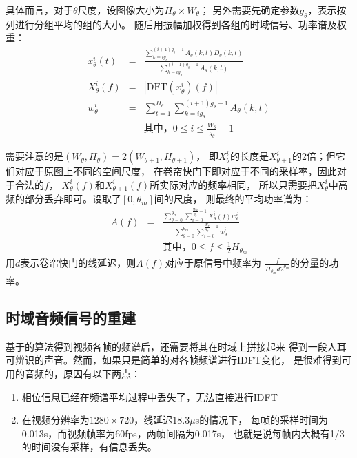 具体而言，对于$\theta$尺度，设图像大小为$H_\theta \times W_\theta$；
另外需要先确定参数$g_\theta$，表示按列进行分组平均的组的大小。
随后用振幅加权得到各组的时域信号、功率谱及权重：
\begin{eqnarray}
    x_\theta^i(t) &=& \frac{\sum_{k=ig_\theta}^{(i+1)g_\theta-1}
    A_\theta(k, t)D_\theta(k, t)}
        {\sum_{k=ig_\theta}^{(i+1)g_\theta-1}A_\theta(k, t)} \\
    X_\theta^i(f) &=& |\text{DFT}(x_\theta^i)(f)| \\
    w_\theta^i &=& \sum_{t=1}^{H_\theta}
        {\sum_{k=ig_\theta}^{(i+1)g_\theta-1}A_\theta(k, t)} \\
    && \text{其中，} 0 \le i \le \frac{W_\theta}{g_\theta} - 1 \nonumber
\end{eqnarray}

需要注意的是$(W_\theta, H_\theta) = 2(W_{\theta+1}, H_{\theta+1})$，
即$X_\theta^i$的长度是$X_{\theta+1}^i$的2倍；但它们对应于原图上不同的空间尺度，
在卷帘快门下即对应于不同的采样率，因此对于合法的$f$，
$X_\theta^i(f)$和$X_{\theta+1}^i(f)$所实际对应的频率相同，
所以只需要把$X_\theta^i$中高频的部分丢弃即可。设取了$[0, \theta_m]$间的尺度，
则最终的平均功率谱为：
\begin{eqnarray}
    A(f) &=& \frac{\sum_{\theta=0}^{\theta_m}
    \sum_{i=0}^{\frac{W_\theta}{g_\theta} - 1}X_\theta^i(f)w_\theta^i}
    {\sum_{\theta=0}^{\theta_m}
    \sum_{i=0}^{\frac{W_\theta}{g_\theta} - 1}w_\theta^i} \\
    && \text{其中，} 0 \le f \le \frac{1}{2}H_{\theta_m} \nonumber
\end{eqnarray}
用$d$表示卷帘快门的线延迟，则$A(f)$对应于原信号中频率为
$\frac{f}{H_{\theta_m}d2^{\theta_m}}$的分量的功率。

\subsection{时域音频信号的重建\label{sec:global-opt}}
基于的算法得到视频各帧的频谱后，还需要将其在时域上拼接起来
得到一段人耳可辨识的声音。然而，如果只是简单的对各帧频谱进行IDFT变化，
是很难得到可用的音频的，原因有以下两点：
\begin{enumerate}
    \item 相位信息已经在频谱平均过程中丢失了，无法直接进行IDFT
    \item 在视频分辨率为$1280\times 720$，线延迟$18.3\mu$s的情况下，
        每帧的采样时间为0.013s，而视频帧率为60fps，两帧间隔为0.017s，
        也就是说每帧内大概有1/3的时间没有采样，有信息丢失。
\end{enumerate}


